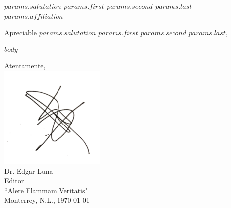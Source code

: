 \documentclass{letter}
\begin{document}
%

\begin{letter}{\vfill {\bfseries $params.salutation$ $params.first$ $params.second$ $params.last$\\ $params.affiliation$}}%

\opening{Apreciable $params.salutation$ $params.first$ $params.second$ $params.last$,}

$body$


\vfill
\begin{center}
Atentamente,\vspace{-1cm}\\
\includegraphics[height=5cm]{edgar} \vspace{-1cm}\\
Dr. Edgar Luna \\
Editor \\
``Alere Flammam Veritatis" \\
Monterrey, N.L., \today
\end{center}
\vfill

\end{letter}
\end{document}

